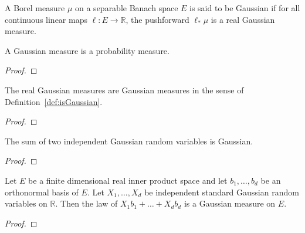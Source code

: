 \begin{definition}\label{def:isGaussian}
\mathlibok
{}
A Borel measure $\mu$ on a separable Banach space $E$ is said to be Gaussian if for all continuous linear maps $\ell : E \to \mathbb{R}$, the pushforward $\ell_*\mu$ is a real Gaussian measure.
\end{definition}

\begin{lemma}\label{lem:isProbabilityMeasure_isGaussian}
\mathlibok
{}
A Gaussian measure is a probability measure.
\end{lemma}

\begin{proof}\leanok
{}
\end{proof}


\begin{lemma}\label{lem:isGaussian_gaussianReal}
\mathlibok
{}
The real Gaussian measures are Gaussian measures in the sense of Definition~\ref{def:isGaussian}.
\end{lemma}

\begin{proof}\leanok

\end{proof}


\begin{lemma}\label{lem:isGaussian_add}
\mathlibok
{}
The sum of two independent Gaussian random variables is Gaussian.
\end{lemma}

\begin{proof}\leanok
{}

\end{proof}


\begin{lemma}\label{lem:stdGaussian_finiteDimensional}
Let $E$ be a finite dimensional real inner product space and let $b_1, \ldots, b_d$ be an orthonormal basis of $E$.
Let $X_1, \ldots, X_d$ be independent standard Gaussian random variables on $\mathbb{R}$.
Then the law of $X_1 b_1 + \ldots + X_d b_d$ is a Gaussian measure on $E$.
\end{lemma}

\begin{proof}

\end{proof}


